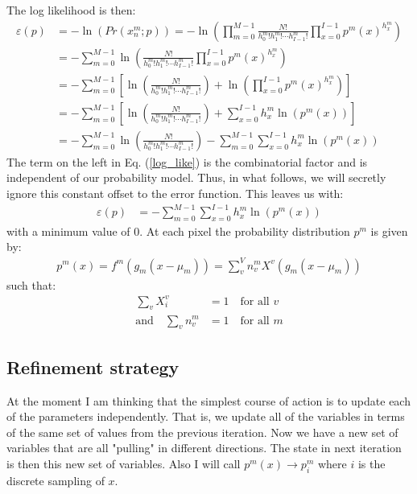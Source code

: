 \documentclass[11pt]{article}
\begin{document}
The log likelihood is then:
\begin{align}
   \varepsilon(p) &= -\ln(Pr(x^m_n; p)) = -\ln\left(\prod_{m=0}^{M-1}\frac{N!}{h^m_0! h^m_1! \cdots h^m_{I-1}!} \prod_{x=0}^{I-1} p^m(x)^{h^m_{x}}\right) \\
   &= -\sum_{m=0}^{M-1}\ln\left(\frac{N!}{h^m_0! h^m_1! \cdots h^m_{I-1}!} \prod_{x=0}^{I-1} p^m(x)^{h^m_{x}}\right) \\
   &= -\sum_{m=0}^{M-1}\left[\ln\left(\frac{N!}{h^m_0! h^m_1! \cdots h^m_{I-1}!}\right) +\ln\left(\prod_{x=0}^{I-1} p^m(x)^{h^m_{x}}\right) \right]\\
   &= -\sum_{m=0}^{M-1}\left[\ln\left(\frac{N!}{h^m_0! h^m_1! \cdots h^m_{I-1}!}\right) +\sum_{x=0}^{I-1} h^m_x \ln\left(p^m(x)\right) \right]\\
   &= -\sum_{m=0}^{M-1}\ln\left(\frac{N!}{h^m_0! h^m_1! \cdots h^m_{I-1}!}\right) -\sum_{m=0}^{M-1} \sum_{x=0}^{I-1} h^m_x \ln\left(p^m(x)\right) 
   \label{log_like}
\end{align}
The term on the left in Eq. (\ref{log_like}) is the combinatorial factor and is independent of our probability model. Thus, in what follows, we will secretly ignore this constant offset to the error function. This leaves us with:
\begin{align}
   \varepsilon(p) &= -\sum_{m=0}^{M-1} \sum_{x=0}^{I-1} h^m_x \ln\left(p^m(x)\right) 
   \label{log_like}
\end{align}
with a minimum value of 0. 
At each pixel the probability distribution $p^m$ is given by:
\begin{align}
   p^m(x) = f^m(g_m (x - \mu_m)) = \sum_v^V n^m_v X^v(g_m( x - \mu_m))
\end{align}
such that:
\begin{align}
   \sum_v X^v_i &= 1 \quad \text{for all } v \\
   \text{and} \quad \sum_v n^m_v &= 1  \quad \text{for all } m 
\end{align}



















\subsection{Refinement strategy}
At the moment I am thinking that the simplest course of action is to update each of the parameters independently. That is, we update all of the variables in terms of the same set of values from the previous iteration. Now we have a new set of variables that are all "pulling" in different directions. The state in next iteration is then this new set of variables. Also I will call $p^m(x) \rightarrow p^m_i$ where $i$ is the discrete sampling of $x$. 
\end{document}
